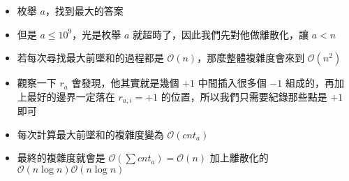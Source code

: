 \documentclass[aspectratio=169]{beamer}
\begin{document}
    \begin{frame}
    		\begin{itemize}
    			\item 枚舉 $a$，找到最大的答案
    			\item 但是 $a \le 10^9$，光是枚舉 $a$ 就超時了，因此我們先對他做離散化，讓 $a < n$
    			\item 若每次尋找最大前墜和的過程都是 $\mathcal{O}(n)$，那麼整體複雜度會來到 $\mathcal{O}(n^2)$
    			\item 觀察一下 $r_a$ 會發現，他其實就是幾個 $+1$ 中間插入很多個 $-1$ 組成的，再加上最好的邊界一定落在 $r_{a,i}=+1$ 的位置，所以我們只需要紀錄那些點是 $+1$ 即可
    			\item 每次計算最大前墜和的複雜度變為 $\mathcal{O}(cnt_a)$
    			\item 最終的複雜度就會是 $\mathcal{O}(\displaystyle\sum{cnt_{a}}) = \mathcal{O}(n)$ 加上離散化的 $\mathcal{O}(n\log n) \mathcal{O}(n\log n)$
    		\end{itemize}
    \end{frame}
\end{document}
